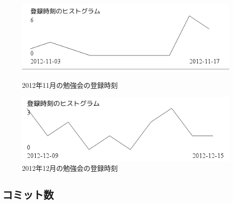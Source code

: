 \documentclass[mingoth,a4paper]{jsarticle}
\begin{document}
\begin{figure}[ht]
\begin{minipage}{0.5\hsize}
 \begin{center}
  \includegraphics[width=1\hsize]{image201304/attendgraph1.png}
 \end{center} 
 \caption{2012年11月の勉強会の登録時刻}
\end{minipage}
\begin{minipage}{0.5\hsize}
\begin{center}
  \includegraphics[width=1\hsize]{image201304/attendgraph2.png}
\end{center} 
\caption{2012年12月の勉強会の登録時刻}
\end{minipage}
\end{figure}

\subsection{コミット数}
\end{document}
